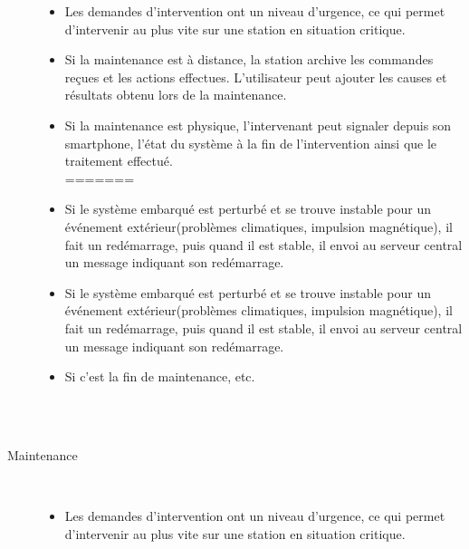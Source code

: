 \documentclass [a4paper] {report}
\begin{document}
\begin{description}
\begin{itemize}
	\item Les demandes d'intervention ont un niveau d'urgence, ce qui permet d'intervenir au plus vite sur une station en situation critique.\\
	\item Si la maintenance est à distance, la station archive les commandes reçues et les actions effectues. L'utilisateur peut ajouter les causes et résultats obtenu lors de la maintenance.\\
	\item Si la maintenance est physique, l'intervenant peut signaler depuis son smartphone, l'état du système à la fin de l'intervention ainsi que le traitement effectué. \\
=======

		\item Si le système embarqué est perturbé et se trouve instable pour un événement extérieur(problèmes climatiques, 
		impulsion magnétique), il fait un redémarrage, puis quand il est stable, il envoi au serveur central un message indiquant son redémarrage.  \\

		\item Si le système embarqué est perturbé et se trouve instable pour un événement extérieur(problèmes climatiques, impulsion magnétique), il fait un redémarrage, puis quand il est stable, il envoi au serveur central un message indiquant son redémarrage.  \\

		\item Si c'est la fin de maintenance, etc.\\\\
	\end{itemize}	\\

\item [Maintenance]\hfill\\
	\begin{itemize}
	\item Les demandes d'intervention ont un niveau d'urgence, ce qui permet d'intervenir au plus vite sur une 
station en situation critique.\\


\end{itemize}
\end{description}
\end{document}
